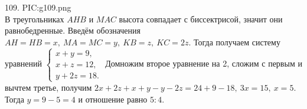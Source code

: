 109. {{PIC:g109.png}}\\
В треугольниках $AHB$ и $MAC$ высота совпадает с биссектрисой, значит они равнобедренные. Введём обозначения $AH=HB=x,\ MA=MC=y,\ KB=z,\ KC=2z.$ Тогда получаем систему уравнений $\begin{cases} x+y=9,\\ x+z=12,\\ y+2z=18.\end{cases}$ Домножим второе уравнение на 2, сложим с первым и вычтем третье, получим $2x+2z+x+y-y-2z=24+9-18,\ 3x=15,\ x=5.$ Тогда $y=9-5=4$ и отношение равно $5:4.$\\

